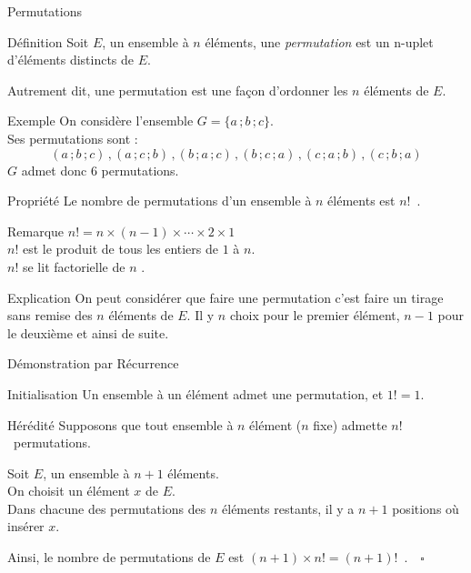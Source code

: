 \documentclass{coursbook}
\begin{document}
    \begin{Gpartie}{Permutations}
        \begin{Spartie}{Définition}
            Soit $E$, un ensemble à $n$ éléments, une \emph{permutation} est un n-uplet d'éléments distincts de $E$.

            Autrement dit, une permutation est une façon d'ordonner les $n$ éléments de $E$.
            \begin{SSpartie}{Exemple}
                On considère l'ensemble $G=\big\{a\,; b\,; c\big\}$. \\ Ses permutations sont :
                \[(a\,; b\,; c)\,, (a\,; c\,; b)\,, (b\,; a\,; c)\,, (b\,; c\,; a)\,, ( c\,; a\,; b)\,,(c\,; b\,; a)\]
                $G$ admet donc 6 permutations.
            \end{SSpartie}
        \end{Spartie}
        \begin{Spartie}{Propriété}
            Le nombre de permutations d'un ensemble à $n$ éléments est $n!$~.
            \begin{SSpartie}{Remarque}
                $n! =n\times(n-1)\times\dotsb\times 2\times 1$ \\
                $n!$ est le produit de tous les entiers de $1$ à $n$. \\
                $n!$ se lit \og factorielle de $n$ \fg{}.
            \end{SSpartie}
            \begin{SSpartie}{Explication}
                On peut considérer que faire une permutation c'est faire un tirage sans remise des $n$ éléments de $E$. Il y $n$ choix pour le premier élément, $n-1$ pour le deuxième et ainsi de suite.
            \end{SSpartie}
            \begin{SSpartie}{Démonstration par Récurrence}
                \begin{SSSpartie}{Initialisation}
                    Un ensemble à un élément admet une permutation, et $1! =1$.
                \end{SSSpartie}
                \begin{SSSpartie}{Hérédité}
                    Supposons que tout ensemble à $n$ élément ($n$ fixe) admette $n!$~permutations.

                    Soit $E$, un ensemble à $n+1$ éléments. \\
                    On choisit un élément $x$ de $E$. \\
                    Dans chacune des permutations des $n$ éléments restants, il y a $n+1$ positions où insérer $x$.

                    Ainsi, le nombre de permutations de $E$ est $(n+1)\times n! =(n+1)!$~.$\quad\square$
                \end{SSSpartie}
            \end{SSpartie}
        \end{Spartie}
    \end{Gpartie}
\end{document}

